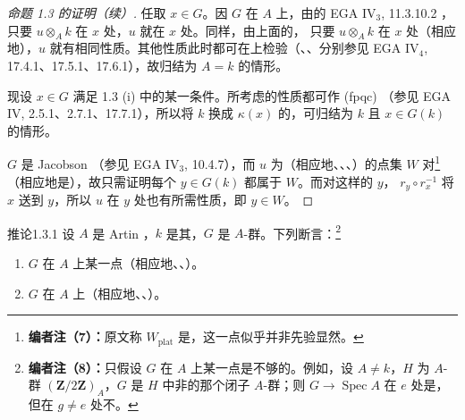 \begin{proof}[命题 1.3 的证明（续）]
任取 $x\in G$。因 $G$ 在 $A$ 上，由的 EGA IV$_3$, 11.3.10.2 ，只要 $u\otimes_Ak$ 在 $x$ 处，$u$ 就在 $x$ 处。同样，由上面的，
只要 $u\otimes_Ak$ 在 $x$ 处（相应地），$u$ 就有相同性质。其他性质此时都可在上检验（、、分别参见 EGA IV$_4$, 17.4.1、17.5.1、17.6.1），故归结为 $A=k$ 的情形。

现设 $x\in G$ 满足 1.3 (i) 中的某一条件。所考虑的性质都可作 (fpqc) （参见 EGA IV, 2.5.1、2.7.1、17.7.1），所以将 $k$ 换成 $\kappa(x)$ 的，可归结为 $k$ 且 $x\in G(k)$ 的情形。

$G$ 是 Jacobson （参见 EGA IV$_3$, 10.4.7），而 $u$ 为（相应地、、、）的点集 $W$ 对\footnote{\textbf{编者注（7）：}原文称 $W_{\mathrm{plat}}$ 是，这一点似乎并非先验显然。}（相应地是），故只需证明每个 $y\in G(k)$ 都属于 $W$。而对这样的 $y$， $r_y\circ r_x^{-1}$ 将 $x$ 送到 $y$，所以 $u$ 在 $y$ 处也有所需性质，即 $y\in W$。
\end{proof}
\begin{SGAresult}{推论}{1.3.1}
设 $A$ 是 Artin ，$k$ 是其，$G$ 是 $A$-群。下列断言：\footnote{\textbf{编者注（8）：}只假设 $G$ 在 $A$ 上某一点是不够的。例如，设 $A\ne k$，$H$ 为 $A$-群 $(\mathbf Z/2\mathbf Z)_A$，$G$ 是 $H$ 中非的那个闭子 $A$-群；则 $G\to\operatorname{Spec}A$ 在 $e$ 处是，但在 $g\ne e$ 处不。}
\begin{enumerate}
\item[(i)] $G$ 在 $A$ 上某一点（相应地、、）。
\item[(ii)] $G$ 在 $A$ 上（相应地、、）。
\end{enumerate}
\end{SGAresult}
